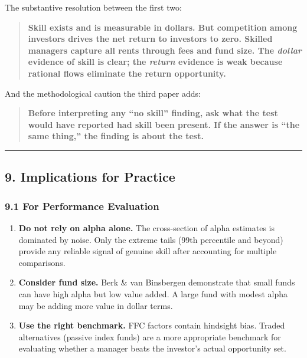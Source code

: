 \documentclass[
  letterpaper,
  DIV=11,
  numbers=noendperiod]{scrartcl}
\begin{document}
The substantive resolution between the first two:

\begin{quote}
\textbf{Skill exists and is measurable in dollars. But competition among
investors drives the net return to investors to zero. Skilled managers
capture all rents through fees and fund size. The \emph{dollar} evidence
of skill is clear; the \emph{return} evidence is weak because rational
flows eliminate the return opportunity.}
\end{quote}

And the methodological caution the third paper adds:

\begin{quote}
\textbf{Before interpreting any ``no skill'' finding, ask what the test
would have reported had skill been present. If the answer is ``the same
thing,'' the finding is about the test.}
\end{quote}

\begin{center}\rule{0.5\linewidth}{0.5pt}\end{center}

\subsection{9. Implications for
Practice}\label{implications-for-practice}

\subsubsection{9.1 For Performance
Evaluation}\label{for-performance-evaluation}

\begin{enumerate}
\def\labelenumi{\arabic{enumi}.}
\item
  \textbf{Do not rely on alpha alone.} The cross-section of alpha
  estimates is dominated by noise. Only the extreme tails (99th
  percentile and beyond) provide any reliable signal of genuine skill
  after accounting for multiple comparisons.
\item
  \textbf{Consider fund size.} Berk \& van Binsbergen demonstrate that
  small funds can have high alpha but low value added. A large fund with
  modest alpha may be adding more value in dollar terms.
\item
  \textbf{Use the right benchmark.} FFC factors contain hindsight bias.
  Traded alternatives (passive index funds) are a more appropriate
  benchmark for evaluating whether a manager beats the investor's actual
  opportunity set.
\end{enumerate}
\end{document}
